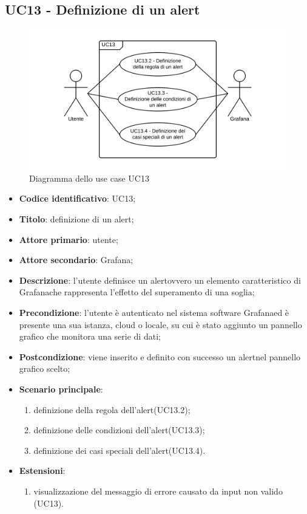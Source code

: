 \subsection{UC13 - Definizione di un alert}
\begin{figure}[H]
\includegraphics{img/UC13_-_Definizione_di_un_alert.png}
\caption{Diagramma dello use case UC13}
\end{figure}
\begin{itemize}
	\item \textbf{Codice identificativo}: UC13;
	\item \textbf{Titolo}: definizione di un alert\glo;
	\item \textbf{Attore primario}: utente;
	\item \textbf{Attore secondario}: Grafana\glo;
	\item \textbf{Descrizione}: l'utente definisce un alert\glosp ovvero un elemento caratteristico di Grafana\glosp che rappresenta l'effetto del superamento di una soglia;
	\item \textbf{Precondizione}: l'utente è autenticato nel sistema software Grafana\glosp ed è presente una sua istanza, cloud o locale, su cui è stato aggiunto un pannello grafico che monitora una serie di dati;
	\item \textbf{Postcondizione}: viene inserito e definito con successo un alert\glosp nel pannello grafico scelto;
	\item \textbf{Scenario principale}: 
	\begin{enumerate}
		\item definizione della regola dell'alert\glosp (UC13.2);
		\item definizione delle condizioni dell'alert\glosp (UC13.3);
		\item definizione dei casi speciali dell'alert\glosp (UC13.4).
	\end{enumerate}
	\item \textbf{Estensioni}:	
	\begin{enumerate}
		\item visualizzazione del messaggio di errore causato da input non valido (UC13).
	\end{enumerate}
\end{itemize}

